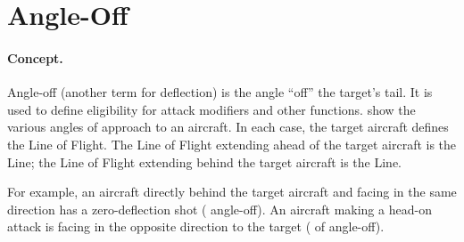 \section{Angle-Off}
\label{rule:angle-off}



\paragraph{Concept.} Angle-off (another term for deflection) is the angle “off” the target's tail. It is used to define eligibility for attack modifiers and other functions.  show the various angles of approach to an aircraft.  In each case, the target aircraft defines the Line of Flight. The Line of Flight extending ahead of the target aircraft is the  Line; the Line of Flight extending behind the target aircraft is the  Line.

For example, an aircraft directly behind the target aircraft and facing in the same direction has a zero-deflection shot ( angle-off). An aircraft making a head-on attack is facing in the opposite direction to the target ( of angle-off).

